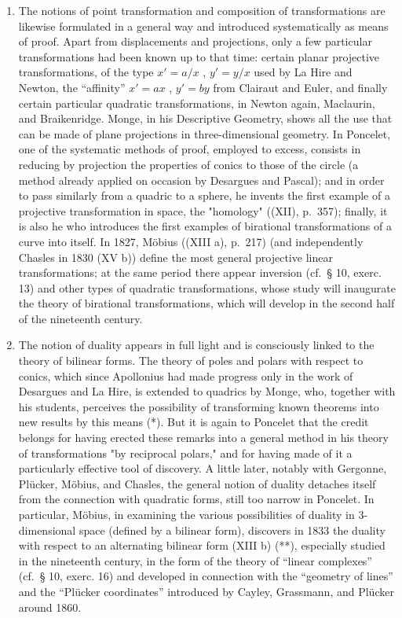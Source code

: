 \begin{enumerate}
\def\labelenumi{\Alph{enumi})}
\setcounter{enumi}{2}
\item
  The notions of point transformation and composition of transformations are likewise formulated in a general way and introduced systematically as means of proof. Apart from displacements and projections, only a few particular transformations had been known up to that time: certain planar projective transformations, of the type \(x' = a/x\) , \(y' = y/x\) used by La Hire and Newton, the “affinity” \(x' = ax\) , \(y' = by\) from Clairaut and Euler, and finally certain particular quadratic transformations, in Newton again, Maclaurin, and Braikenridge. Monge, in his Descriptive Geometry, shows all the use that can be made of plane projections in three-dimensional geometry. In Poncelet, one of the systematic methods of proof, employed to excess, consists in reducing by projection the properties of conics to those of the circle (a method already applied on occasion by Desargues and Pascal); and in order to pass similarly from a quadric to a sphere, he invents the first example of a projective transformation in space, the "homology" ((XII), p.~357); finally, it is also he who introduces the first examples of birational transformations of a curve into itself. In 1827, Möbius ((XIII a), p.~217) (and independently Chasles in 1830 (XV b)) define the most general projective linear transformations; at the same period there appear inversion (cf.~§ 10, exerc. 13) and other types of quadratic transformations, whose study will inaugurate the theory of birational transformations, which will develop in the second half of the nineteenth century.
\item
  The notion of duality appears in full light and is consciously linked to the theory of bilinear forms. The theory of poles and polars with respect to conics, which since Apollonius had made progress only in the work of Desargues and La Hire, is extended to quadrics by Monge, who, together with his students, perceives the possibility of transforming known theorems into new results by this means (*). But it is again to Poncelet that the credit belongs for having erected these remarks into a general method in his theory of transformations "by reciprocal polars," and for having made of it a particularly effective tool of discovery. A little later, notably with Gergonne, Plücker, Möbius, and Chasles, the general notion of duality detaches itself from the connection with quadratic forms, still too narrow in Poncelet. In particular, Möbius, in examining the various possibilities of duality in 3-dimensional space (defined by a bilinear form), discovers in 1833 the duality with respect to an alternating bilinear form (XIII b) (**), especially studied in the nineteenth century, in the form of the theory of “linear complexes” (cf.~§ 10, exerc. 16) and developed in connection with the “geometry of lines” and the “Plücker coordinates” introduced by Cayley, Grassmann, and Plücker around 1860.

\end{enumerate}
